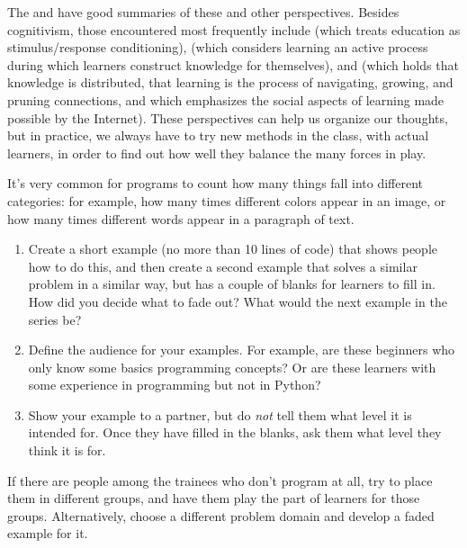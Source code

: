 The  and \cite{Wibu2016}
have good summaries of these and other perspectives.
Besides cognitivism,
those encountered most frequently include 
(which treats education as stimulus/response conditioning),
(which considers learning an active process during which learners construct knowledge for themselves),
and 
(which holds that knowledge is distributed,
that learning is the process of navigating, growing, and pruning connections,
and which emphasizes the social aspects of learning made possible by the Internet).
These perspectives can help us organize our thoughts,
but in practice,
we always have to try new methods in the class,
with actual learners,
in order to find out how well they balance the many forces in play.



It's very common for programs to count how many things fall into
different categories: for example, how many times different colors
appear in an image, or how many times different words appear in a
paragraph of text.

\begin{enumerate}
\item
  Create a short example (no more than 10 lines of code) that shows
  people how to do this, and then create a second example that solves
  a similar problem in a similar way, but has a couple of blanks for
  learners to fill in. How did you decide what to fade out? What would
  the next example in the series be?
\item
  Define the audience for your examples. For example, are these
  beginners who only know some basics programming concepts? Or are
  these learners with some experience in programming but not in
  Python?
\item
  Show your example to a partner, but do \emph{not} tell them what level it
  is intended for. Once they have filled in the blanks, ask them what
  level they think it is for.
\end{enumerate}

If there are people among the trainees who don't program at all, try to
place them in different groups, and have them play the part of learners
for those groups. Alternatively, choose a different problem domain and
develop a faded example for it.


